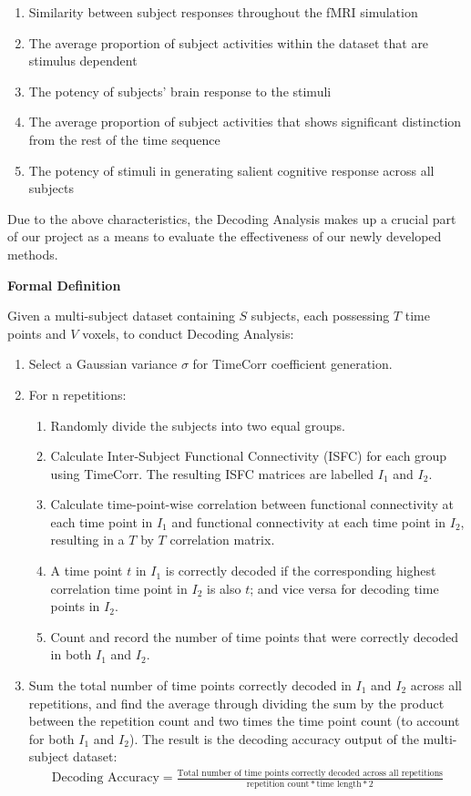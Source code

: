 \documentclass[11pt]{article}
\begin{document}
\begin{enumerate}
\item Similarity between subject responses throughout the fMRI simulation
\item The average proportion of subject activities within the dataset that are stimulus dependent
\item The potency of subjects' brain response to the stimuli
\item The average proportion of subject activities that shows significant distinction from the rest of the time sequence
\item The potency of stimuli in generating salient cognitive response across all subjects
\end{enumerate}

Due to the above characteristics, the Decoding Analysis makes up a crucial part of our project as a means to evaluate the effectiveness of our newly developed methods.

\large{\textbf{Formal Definition}}

\normalsize
Given a multi-subject dataset containing $S$ subjects, each possessing $T$ time points and $V$ voxels, to conduct Decoding Analysis:
\begin{enumerate}
\item Select a Gaussian variance $\sigma$ for TimeCorr coefficient generation.
\item For n repetitions:
\begin{enumerate}
\item Randomly divide the subjects into two equal groups.
\item Calculate Inter-Subject Functional Connectivity (ISFC) for each group using TimeCorr. The resulting ISFC matrices are labelled $I_1$ and $I_2$.
\item Calculate time-point-wise correlation between functional connectivity at each time point in $I_1$ and functional connectivity at each time point in $I_2$, resulting in a $T$ by $T$ correlation matrix.
\item A time point $t$ in $I_1$ is correctly decoded if the corresponding highest correlation time point in $I_2$ is also $t$; and vice versa for decoding time points in $I_2$.
\item Count and record the number of time points that were correctly decoded in both $I_1$ and $I_2$.
\end{enumerate}
\item Sum the total number of time points correctly decoded in $I_1$ and $I_2$ across all repetitions, and find the average through dividing the sum by the product between the repetition count and two times the time point count (to account for both $I_1$ and $I_2$). The result is the decoding accuracy output of the multi-subject dataset:
\begin{align*}
\text{Decoding Accuracy} = \frac{\text{Total number of time points correctly decoded across all repetitions}}{\text{repetition count} * \text{time length} * 2}
\end{align*}
\end{enumerate}
\end{document}
